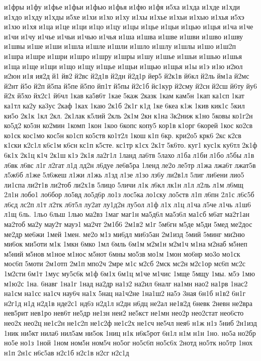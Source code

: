 {и1фры
и1фу
и1фье
и1фьи
и1фью
и1фья
и1фю
и1фя
и5ха
и1хда
и1хде
и1хди
и1хдо
и1хду
и1хды
и5хе
и1хи
и1хо
и1ху
и1хы
и1хье
и1хьи
и1хью
и1хья
и5хэ
и1хю
и1хя
и1ца
и1це
и1ци
и1цо
и1цу
и1цы
и1цье
и1цьи
и1цью
и1цья
и1ча
и1че
и1чи
и1чу
и1чье
и1чьи
и1чью
и1чья
и1ша
и1шва
и1шве
и1шви
и1шво
и1шву
и1швы
и1ше
и1ши
и1шла
и1шле
и1шли
и1шло
и1шлу
и1шлы
и1шо
и1ш2п
и1шра
и1шре
и1шри
и1шро
и1шру
и1шры
и1шу
и1шье
и1шьи
и1шью
и1шья
и1ща
и1ще
и1щи
и1що
и1щу
и1щье
и1щьи
и1щью
и1щья
и1ы
и1э
и1ю
и2юл
и2юн
и1я
ия2д
й1
йв2
й2вс
й2д1в
й2дн
й2д1р
йер5
й2к1в
й6кл
й2ль
йм1а
й2мс
й2нт
й5о
й2п
й5па
й5пе
й5по
йп1т
й5пы
й2с1б
йс1кур
й2сму
й2сн
й2сш
й6ту
йу6
й2х
й5хо
йх2с1
й6чл
1кав
ка5в6т
1кае
5каж
2казк
1кам
кам5н
1кап
ка1сп
1кат
ка1тл
ка2у
ка3ус
2каф
1ках
1каю
2к1б
2к1г
к1д
1ке
6кеа
к1ж
1кив
кик1с
5кил
ки5о
2к1к
1кл
2кл.
2к1лак
к5лий
2кль
2к1м
2кн
к1на
3к2ниж
к1но
5ковы
ко1г2н
ко5д2
ко5зн
ко2мин
1комп
1кон
1коо
6копс
копу5
кор1в
к1орг
6корей
1кос
ко2св
ко1ск
кос1мо
кос5н
ко1сп
ко5ств
ко1т2л
1кош
к1п
6кр.
кри2о5
крк6
2кс
к2св
к1ски
к2с1л
к6с1м
к6сн
кс1п
к5сте.
кс1тр
к1сх
2к1т
5к6то.
куг1
кус1к
ку6тл
2к1ф
6к1х
2к1ц
к1ч
2к1ш
к1э
2к1я
ла2г1л
1ланд
ла6тв
5лахо
л1ба
л1би
л1бо
л5бы
л1в
л6вк
л6вс
л1г
л2гат
л1д
лд2н
л6дуе
ле6в5ра
1ленд
ле2о
ле5тр
л1жа
лжа6т
лжат5в
л5ж6б
л1же
5л6жеш
л1жи
л1жь
л1зд
л1зе
л1зо
лз6у
ли2в1л
5лиг
ли6ени
лио5
ли1спа
ли2т1в
ли2тоб
ли2х1в
5лицо
5личи
л1к
л6кл
лк1н
л1л
л2ль
л1м
л6мщ
2л1н
лобо1
ло6бор
ло5вд
ло5д6р
ло1з
лос5ка
ло1ску
ло5ств
л1п
л6пн
2л1с
л6с5б
л6сд
лс2п
л1т
л2тк
л6т5л
лу2ат
лу1д2н
лу5ол
л1ф
л1х
л1ц
л1ча
л5че
л1чь
л1ш6
л1щ
6ль.
1льо
6льш
1лью
ма2вз
1маг
маг1н
ма5д6л
ма5з6л
ма1сб
м6ат
ма2т1ан
ма2тоб
ма2у
мау2т
мауэ1
ма2чт
2м1б6
2м1в2
м1г
5м6гн
м5де
м5ди
5мед
ме2дос
ме2др
ме6жи
1мей
1мен.
ме2о
м1з
ми6дл
ми6з5ан
2м1изд
5мий
5минг
ми2ню
ми6ок
ми5оти
м1к
1мкн
6мко
1мл
6мль
6м1м
м2м1н
м2м1ч
м1на
м2наб
м5неп
м5ний
м5нов
м1ное
м1нос
м5нот
6мны
мо5зв
мо1м
1мон
мо6нр
мо3о
мо1ск
мос6п
5моти
2м1отп
2м1п
мпо2ч
2мре
м1с
м2сб
2мск
мс2н
м2с1ор
мс6п
мс2с
1м2сти
6м1т
1мус
му5с6к
м1ф
6м1х
6м1ц
м1че
м1чис
1мще
5мщу
1мы.
м5э
1мю
м1ю2с
1на.
6навг
1на1г
1над
на2др
на1з2
на2ил
6налг
на1мн
нао2
на1рв
1нас2
на1см
на1сс
на1сч
нау6ч
на1х
5нац
на1ч2не
1на1ш2
на5э
3ная
6н1б
н1в2
6н1г
н2г1д
н1д
н2д1в
нде2с1
нд6з
н2д1л
н2дн
н6дц
не2ал
не1в2д
6невк
2невн
не2вра
нев5рит
нев1ро
нев6т
не5др
не1зн
неи2
не5кст
не1мн
нео2р
нео2стат
нео6сто
нео2х
нео2ц
не1с2н
не1с2п
не1с2ф
не1с2х
не1сч
не5чл
нея6
н1ж
н1з
5ниб
2н1изд
1ник
ни5кт
нила6
нил5ам
ни5ок
1ниц
н1к
н6к5рот
6н1л
н1м
н1н
1но.
но5а
но2бр
но5е
но1з
1ной
1ном
ном5н
ном5ч
но5ог
но5с6п
но5с6х
2нотд
но5тк
но5тр
1нох
н1п
2н1с
н6с5ав
н2с1б
н2с1в
н2сг
н2с1д
}
